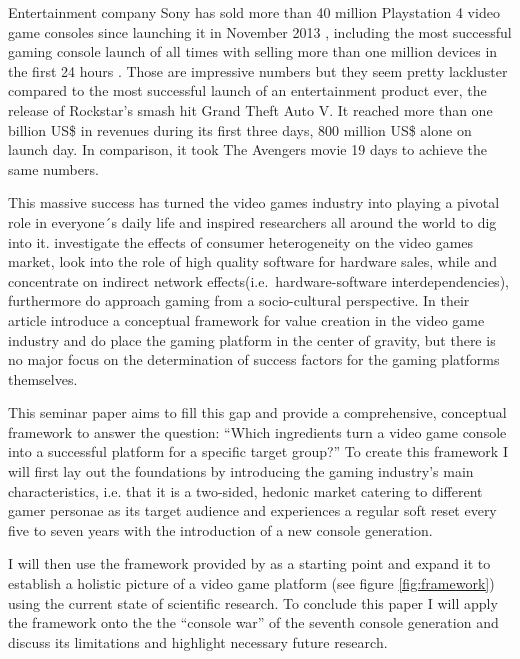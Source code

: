 \documentclass
[
    a4paper,
    11pt
]
{article}
\begin{document}
Entertainment company Sony has sold more than 40 million Playstation 4
video game consoles since launching it in November 2013 \cite{Sony2016},
including the most successful gaming console launch of all times with
selling more than one million devices in the first 24 hours
\cite{ShuheiYoshida2013}. Those are impressive numbers but they seem
pretty lackluster compared to the most successful launch of an
entertainment product ever, the release of Rockstar's smash hit
Grand Theft Auto V. It reached more than one billion US\$ in revenues
during its first three days, 800 million US\$ alone on launch day. In
comparison, it took The Avengers movie 19 days to achieve the same numbers.
\cite{Gamespot2013}

This massive success has turned the video games industry into playing a
pivotal role in everyone´s daily life \cite{ESA2016a} and inspired
researchers all around the world to dig into it. \cite{Sun2016}
investigate the effects of consumer heterogeneity on the video games
market, \cite{Binken2009} look into the role of high quality software
for hardware sales, while \cite{Shankar2002} and \cite{Clements2005}
concentrate on indirect network effects(i.e.~hardware-software
interdependencies), furthermore do \cite{Aoyama2003} approach gaming
from a socio-cultural perspective. In their article
\cite{Hennig-Thurau2013} introduce a conceptual framework for value
creation in the video game industry and do place the gaming platform in
the center of gravity, but there is no major focus on the determination
of success factors for the gaming platforms themselves.

This seminar paper aims to fill this gap and provide a comprehensive,
conceptual framework to answer the question: ``Which ingredients turn a
video game console into a successful platform for a specific target
group?'' To create this framework I will first lay out the foundations
by introducing the gaming industry's main characteristics, i.e. that it
is a two-sided, hedonic market catering to different gamer personae as
its target audience and experiences a regular soft reset every five to seven
years with the introduction of a new console
generation.\cite{Gallagher2002}

I will then use the framework provided by \cite{Hennig-Thurau2013} as a
starting point and expand it to establish a holistic picture of a video
game platform (see figure \ref{fig:framework}) using the current state of
scientific research. To conclude this paper I will apply the framework
onto the the ``console war'' of the seventh console generation and
discuss its limitations and highlight necessary future research.
%
\end{document}
